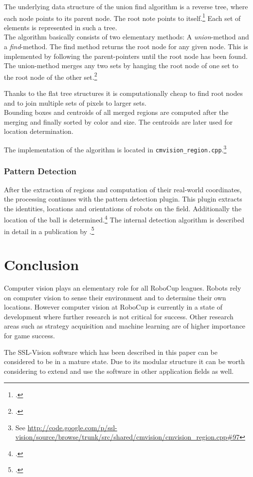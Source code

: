 The underlying data structure of the union find algorithm is a reverse tree, where each node points to its parent node.
The root note points to itself.\footcite[Cf.][]{wa_union_find}
Each set of elements is represented in such a tree.\\
The algorithm basically consists of two elementary methods: A \textit{union}-method and a \textit{find}-method.
The find method returns the root node for any given node. This is implemented by following the parent-pointers
until the root node has been found. The union-method merges any two sets by hanging the root node of one set to the
root node of the other set.\footcite[Cf.][]{wa_union_find}

Thanks to the flat tree structures it is computationally cheap to find root nodes and to join multiple sets of pixels
to larger sets.\\
Bounding boxes and centroids of all merged regions are computed after the merging and finally
sorted by color and size. The centroids are later used for location determination.

The implementation of the algorithm is located in
\texttt{cmvision\_region.cpp}.\footnote{See
\url{http://code.google.com/p/ssl-vision/source/browse/trunk/src/shared/cmvision/cmvision_region.cpp\#97}}




\subsubsection{Pattern Detection}
After the extraction of regions and computation of their real-world coordinates,
the processing continues with the pattern detection plugin.
This plugin extracts the identities, locations and orientations of robots on the field.
Additionally the location of the ball is determined.\footcite[Cf.][p. 6 et sq.]{zickler_ssl_vision}
The internal detection algorithm
is described in detail in a publication by \citeauthor{bruce_2003}.\footcite[Cf.][]{bruce_2003}


\clearpage
\section{Conclusion}
\label{sec:conclusion}
Computer vision plays an elementary role for all RoboCup leagues. Robots rely on
computer vision to sense their environment and to determine their own locations.
However computer vision at RoboCup is currently in a state of development where
further research is not critical for success. Other research areas such as strategy
acquisition and machine learning are of higher importance for game success.

The SSL-Vision software which has been described in this paper can be considered
to be in a mature state. Due to its modular structure it can be worth considering
to extend and use the software in other application fields as well.



